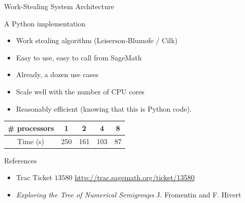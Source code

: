 \documentclass{beamer}
\begin{document}


\begin{frame}{Work-Stealing System Architecture}
  
  \begin{block}{A Python implementation}
    \begin{itemize}
    \item Work stealing algorithm (Leiserson-Blumofe / Cilk)
    \item Easy to use, easy to call from SageMath
    \item Already, a dozen  use cases
    \item Scale well with the number of CPU cores
    \item Reasonably efficient (knowing that this is Python code).
    \end{itemize}
  \end{block}

  \begin{center}
      \begin{tabular}{c|cccc}
    \toprule
    \# processors & 1 & 2 & 4 & 8\\
    \midrule
    Time (s) & 250 & 161 & 103 & 87
    \bottomrule
  \end{tabular}
  \end{center}

  \begin{block}{References}
    {\footnotesize
      \begin{itemize}  \item Trac Ticket $13580$ \url{http://trac.sagemath.org/ticket/13580}
      \item \textit{Exploring the Tree of Numerical Semigroups} J. Fromentin
        and F. Hivert %
      \end{itemize}
      }
  \end{block}
\end{frame}
\end{document}
